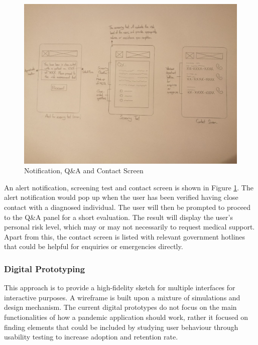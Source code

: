       \begin{figure}[H]
        \centering
        \includegraphics[width=\linewidth]{img/low-fidelity-prototype/sketch-3.png}
        \caption{Notification, Q\&A and Contact Screen}
        \label{fig:prototype-03}
      \end{figure}
      
      \par An alert notification, screening test and contact screen is shown in Figure \ref{fig:prototype-03}. The alert notification would pop up when the user has been verified having close contact with a diagnosed individual. The user will then be prompted to proceed to the Q\&A panel for a short evaluation. The result will display the user’s personal risk level, which may or may not necessarily to request medical support. Apart from this, the contact screen is listed with relevant government hotlines that could be helpful for enquiries or emergencies directly.

    \subsubsection{Digital Prototyping}
      \par This approach is to provide a high-fidelity sketch for multiple interfaces for interactive purposes. A wireframe is built upon a mixture of simulations and design mechanism. The current digital prototypes do not focus on the main functionalities of how a pandemic application should work, rather it focused on finding elements that could be included by studying user behaviour through usability testing to increase adoption and retention rate.

